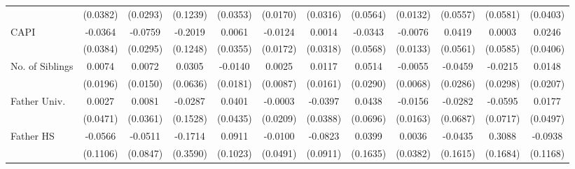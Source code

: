 \begin{table}[htbp]
\begin{tabular*}{0.7\hsize}{@{\hskip\tabcolsep\extracolsep\fill}l*{11}{c}}
            &    (0.0382)         &    (0.0293)         &    (0.1239)         &    (0.0353)         &    (0.0170)         &    (0.0316)         &    (0.0564)         &    (0.0132)         &    (0.0557)         &    (0.0581)         &    (0.0403)         \\
\addlinespace
CAPI        &     -0.0364         &     -0.0759\sym{*}  &     -0.2019         &      0.0061         &     -0.0124         &      0.0014         &     -0.0343         &     -0.0076         &      0.0419         &      0.0003         &      0.0246         \\
            &    (0.0384)         &    (0.0295)         &    (0.1248)         &    (0.0355)         &    (0.0172)         &    (0.0318)         &    (0.0568)         &    (0.0133)         &    (0.0561)         &    (0.0585)         &    (0.0406)         \\
\addlinespace
No. of Siblings&      0.0074         &      0.0072         &      0.0305         &     -0.0140         &      0.0025         &      0.0117         &      0.0514         &     -0.0055         &     -0.0459         &     -0.0215         &      0.0148         \\
            &    (0.0196)         &    (0.0150)         &    (0.0636)         &    (0.0181)         &    (0.0087)         &    (0.0161)         &    (0.0290)         &    (0.0068)         &    (0.0286)         &    (0.0298)         &    (0.0207)         \\
\addlinespace
Father Univ.&      0.0027         &      0.0081         &     -0.0287         &      0.0401         &     -0.0003         &     -0.0397         &      0.0438         &     -0.0156         &     -0.0282         &     -0.0595         &      0.0177         \\
            &    (0.0471)         &    (0.0361)         &    (0.1528)         &    (0.0435)         &    (0.0209)         &    (0.0388)         &    (0.0696)         &    (0.0163)         &    (0.0687)         &    (0.0717)         &    (0.0497)         \\
\addlinespace
Father HS   &     -0.0566         &     -0.0511         &     -0.1714         &      0.0911         &     -0.0100         &     -0.0823         &      0.0399         &      0.0036         &     -0.0435         &      0.3088         &     -0.0938         \\
            &    (0.1106)         &    (0.0847)         &    (0.3590)         &    (0.1023)         &    (0.0491)         &    (0.0911)         &    (0.1635)         &    (0.0382)         &    (0.1615)         &    (0.1684)         &    (0.1168)         \\

\end{tabular*}
\end{table}
